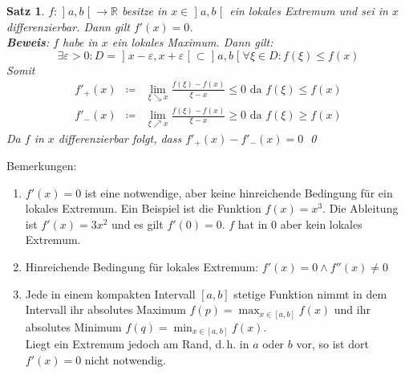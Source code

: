 \documentclass[ngerman,titlepage,twoside, parskip=half*]{scrreprt}
\newcommand*{\R}{\mathbb{R}}
\theoremstyle{plain}
\newtheorem{theorem}{Satz}[section]
\theoremstyle{definition}
\theoremstyle{remark}
\newcommand*{\bsofint}[1]{\mathopen{]}#1\mathclose{[}} %
\begin{document}
\begin{theorem}
  \label{satz:lokExtremum}
  $f\colon\bsofint{a,b}\rightarrow\R$ besitze in $x\in \bsofint{a,b}$ ein lokales Extremum
  und sei in $x$ differenzierbar. Dann gilt $f'(x)=0$.\\
  \textbf{Beweis}: $f$ habe in $x$ ein lokales Maximum. Dann gilt:
  \[\exists\varepsilon>0\colon D=\bsofint{x-\varepsilon,x+\varepsilon}\subset\bsofint{a,b}
  \forall\xi\in D\colon f(\xi)\leq f(x)\]
  Somit
  \begin{align*}
    f'_+(x) & \coloneqq & \lim_{\xi\searrow x}\frac{f(\xi)-f(x)}{\xi-x}\leq 0 \text{ da } f(\xi)\leq f(x)\\
    f'_-(x) & \coloneqq & \lim_{\xi\nearrow x}\frac{f(\xi)-f(x)}{\xi-x}\geq 0 \text{ da } f(\xi)\geq f(x)
  \end{align*}
  Da $f$ in $x$ differenzierbar folgt, dass $f'_+(x)-f'_-(x)=0$
  \qed
\end{theorem}

Bemerkungen:
\begin{enumerate}[(1)]
  \item $f'(x)=0$ ist eine notwendige, aber keine hinreichende 
    Bedingung für ein lokales Extremum. Ein Beispiel ist die Funktion
    $f(x)=x^3$. Die Ableitung ist $f'(x)=3x^2$ und es gilt $f'(0)=0$.
    $f$ hat in 0 aber kein lokales Extremum.
  \item Hinreichende Bedingung für lokales Extremum: $f'(x)=0\wedge f''(x)\neq 0$
  \item Jede in einem kompakten Intervall $[a,b]$ stetige Funktion nimmt
    in dem Intervall ihr absolutes Maximum $f(p)=\max_{x\in[a,b]}f(x)$
    und ihr absolutes Minimum $f(q)=\min_{x\in[a,b]}f(x)$.\\
    Liegt ein Extremum jedoch am Rand, d.\,h. in $a$ oder $b$ vor, so ist
    dort $f'(x)=0$ nicht notwendig.
\end{enumerate}
\end{document}

